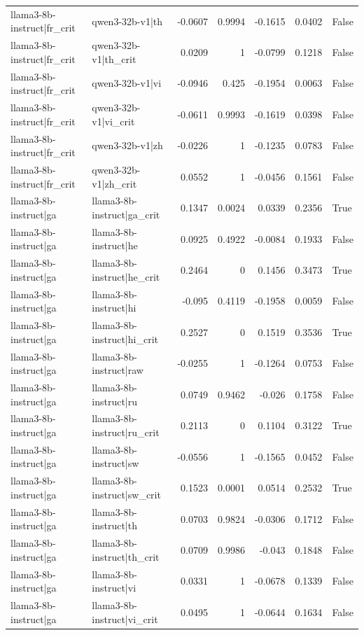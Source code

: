 \begin{table}
\begin{tabular}{l l r r r r l}
llama3-8b-instruct|fr_crit & qwen3-32b-v1|th & -0.0607 & 0.9994 & -0.1615 & 0.0402 & False \\
llama3-8b-instruct|fr_crit & qwen3-32b-v1|th_crit & 0.0209 & 1 & -0.0799 & 0.1218 & False \\
llama3-8b-instruct|fr_crit & qwen3-32b-v1|vi & -0.0946 & 0.425 & -0.1954 & 0.0063 & False \\
llama3-8b-instruct|fr_crit & qwen3-32b-v1|vi_crit & -0.0611 & 0.9993 & -0.1619 & 0.0398 & False \\
llama3-8b-instruct|fr_crit & qwen3-32b-v1|zh & -0.0226 & 1 & -0.1235 & 0.0783 & False \\
llama3-8b-instruct|fr_crit & qwen3-32b-v1|zh_crit & 0.0552 & 1 & -0.0456 & 0.1561 & False \\
llama3-8b-instruct|ga & llama3-8b-instruct|ga_crit & 0.1347 & 0.0024 & 0.0339 & 0.2356 & True \\
llama3-8b-instruct|ga & llama3-8b-instruct|he & 0.0925 & 0.4922 & -0.0084 & 0.1933 & False \\
llama3-8b-instruct|ga & llama3-8b-instruct|he_crit & 0.2464 & 0 & 0.1456 & 0.3473 & True \\
llama3-8b-instruct|ga & llama3-8b-instruct|hi & -0.095 & 0.4119 & -0.1958 & 0.0059 & False \\
llama3-8b-instruct|ga & llama3-8b-instruct|hi_crit & 0.2527 & 0 & 0.1519 & 0.3536 & True \\
llama3-8b-instruct|ga & llama3-8b-instruct|raw & -0.0255 & 1 & -0.1264 & 0.0753 & False \\
llama3-8b-instruct|ga & llama3-8b-instruct|ru & 0.0749 & 0.9462 & -0.026 & 0.1758 & False \\
llama3-8b-instruct|ga & llama3-8b-instruct|ru_crit & 0.2113 & 0 & 0.1104 & 0.3122 & True \\
llama3-8b-instruct|ga & llama3-8b-instruct|sw & -0.0556 & 1 & -0.1565 & 0.0452 & False \\
llama3-8b-instruct|ga & llama3-8b-instruct|sw_crit & 0.1523 & 0.0001 & 0.0514 & 0.2532 & True \\
llama3-8b-instruct|ga & llama3-8b-instruct|th & 0.0703 & 0.9824 & -0.0306 & 0.1712 & False \\
llama3-8b-instruct|ga & llama3-8b-instruct|th_crit & 0.0709 & 0.9986 & -0.043 & 0.1848 & False \\
llama3-8b-instruct|ga & llama3-8b-instruct|vi & 0.0331 & 1 & -0.0678 & 0.1339 & False \\
llama3-8b-instruct|ga & llama3-8b-instruct|vi_crit & 0.0495 & 1 & -0.0644 & 0.1634 & False \\

\end{tabular}
\end{table}

